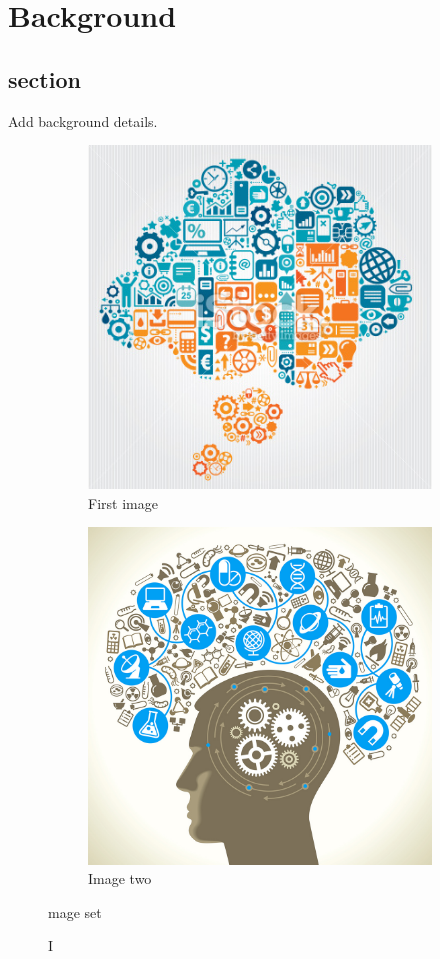 \chapter{Background}
\label{Background}


\section{section}

Add background details.



\begin{figure}
\centering
\begin{subfigure}{.5\textwidth}
  \centering
  \includegraphics[width=0.7\linewidth]{Images/b}
  \caption{First image}
  \label{fig:risub1}
\end{subfigure}%
\begin{subfigure}{.5\textwidth}
  \centering
  \includegraphics[width=0.7\linewidth]{Images/Research}
  \caption{Image two}
  \label{fig:risub2}
\end{subfigure}
\caption Image set
\label{fig:rimacoverview}
\end{figure}



